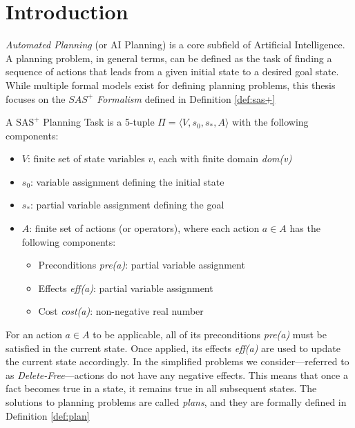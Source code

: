 \chapter{Introduction}
\label{ch:intro}
\textit{Automated Planning} (or AI Planning) is a core subfield of Artificial Intelligence.
A planning problem, in general terms, can be defined as the task of finding a sequence
of actions that leads from a given initial state to a desired goal state.
While multiple formal models exist for defining planning problems, this thesis
focuses on the \textit{$SAS^+$ Formalism} defined in Definition \ref{def:sas+}

\begin{definition}
	\label{def:sas+}
	A $\text{SAS}^+$ Planning Task is a 5-tuple $\Pi = \langle V, s_0, s_*, A \rangle$ with
	the following components:
	\begin{itemize}
		\item \(V\): finite set of state variables \(v\),
		      each with finite domain \textit{dom(v)}
		\item \(s_0\): variable assignment defining the initial state
		\item \(s_*\): partial variable assignment defining the goal
		\item \(A\): finite set of actions (or operators),
		      where each action $a \in A$ has the following components:
		      \begin{itemize}
			      \item Preconditions \textit{pre(a)}: partial variable assignment
			      \item Effects \textit{eff(a)}: partial variable assignment
			      \item Cost \textit{cost(a)}: non-negative real number
		      \end{itemize}
	\end{itemize}
\end{definition}

For an action $a \in A$ to be applicable, all of its preconditions
\textit{pre(a)} must be satisfied in the current state. Once applied, its effects
\textit{eff(a)} are used to update the current state accordingly.
In the simplified problems we consider—referred to as \textit{Delete-Free}—actions do not have any negative effects.
This means that once a fact becomes true in a state, it remains true in all subsequent states.
The solutions to planning problems are called \textit{plans}, and they are formally defined in Definition \ref{def:plan}

